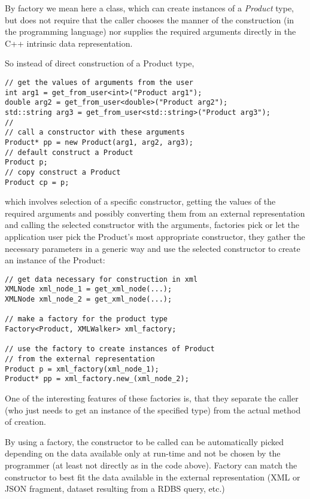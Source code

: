By factory we mean here a class, which can create
instances of a {\em Product} type, but does not require that
the caller chooses the manner of the construction (in the programming
language) nor supplies the required arguments directly
in the C++ intrinsic data representation.

So instead of direct construction of a Product type,

\begin{verbatim}
// get the values of arguments from the user
int arg1 = get_from_user<int>("Product arg1");
double arg2 = get_from_user<double>("Product arg2");
std::string arg3 = get_from_user<std::string>("Product arg3");
//
// call a constructor with these arguments
Product* pp = new Product(arg1, arg2, arg3);
// default construct a Product
Product p;
// copy construct a Product
Product cp = p;
\end{verbatim}

which involves selection of a specific constructor, getting
the values of the required arguments and possibly converting 
them from an external representation and calling the selected
constructor with the arguments, 
factories pick or let the application user pick the Product's most
appropriate constructor, they gather the necessary parameters
in a generic way and use the selected constructor to create
an instance of the Product:

\begin{verbatim}
// get data necessary for construction in xml
XMLNode xml_node_1 = get_xml_node(...);
XMLNode xml_node_2 = get_xml_node(...);

// make a factory for the product type
Factory<Product, XMLWalker> xml_factory;

// use the factory to create instances of Product
// from the external representation
Product p = xml_factory(xml_node_1);
Product* pp = xml_factory.new_(xml_node_2);
\end{verbatim}

One of the interesting features of these factories is,
that they separate the caller (who just needs to get an instance
of the specified type) from the actual method of creation.

By using a factory, the constructor to be called can 
be automatically picked depending on the data available only at run-time
and not be chosen by the programmer (at least not directly
as in the code above). Factory can match
the constructor to best fit the data available in the external
representation (XML or JSON fragment, dataset resulting from a
RDBS query, etc.)

